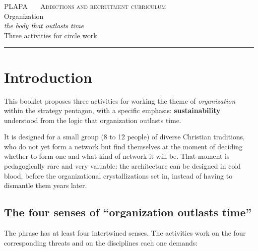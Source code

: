\documentclass[11pt, a4paper]{article}
\begin{document}

\thispagestyle{plain}
\begin{center}
  \vspace*{1.5em}
  {\color{tenue}\scshape\small PLAPA \ \textbullet\ \ Addictions and recruitment curriculum}\\
  \vspace{2em}
  {\color{organizacionVerde}\Huge Organization}\\[0.35em]
  {\color{tinte}\LARGE\itshape the body that outlasts time}\\
  \vspace{1.4em}
  {\color{tenue}\large Three activities for circle work}\\
  \vspace{0.6em}
  {\color{regla}\rule{0.35\linewidth}{0.5pt}}
\end{center}

\vspace{2em}

\section*{Introduction}

This booklet proposes three activities for working the theme of \emph{organization} within the strategy pentagon, with a specific emphasis: \textbf{sustainability} understood from the logic that organization outlasts time.

It is designed for a small group (8 to 12 people) of diverse Christian traditions, who do not yet form a network but find themselves at the moment of deciding whether to form one and what kind of network it will be. That moment is pedagogically rare and very valuable: the architecture can be designed in cold blood, before the organizational crystallizations set in, instead of having to dismantle them years later.

\subsection*{The four senses of ``organization outlasts time''}

The phrase has at least four intertwined senses. The activities work on the four corresponding threats and on the disciplines each one demands:
\end{document}
